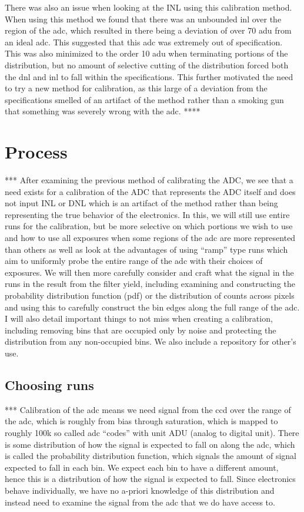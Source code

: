 \documentclass[11pt, letterpaper]{article}
\begin{document}
There was also an issue when looking at the INL using this calibration method. When using this method we found that there was an unbounded inl over the region of the adc, which resulted in there being a deviation of over 70 adu from an ideal adc. This suggested that this adc was extremely out of specification. This was also minimized to the order 10 adu when terminating portions of the distribution, but no amount of selective cutting of the distribution forced both the dnl and inl to fall within the specifications. This further motivated the need to try a new method for calibration, as this large of a deviation from the specifications smelled of an artifact of the method rather than a smoking gun that something was severely wrong with the adc. 
**** 

\section{Process}
*** After examining the previous method of calibrating the ADC, we see that a need exists for a calibration of the ADC that represents the ADC itself and does not input INL or DNL which is an artifact of the method rather than being representing the true behavior of the electronics. In this, we will still use entire runs for the calibration, but be more selective on which portions we wish to use and how to use all exposures when some regions of the adc are more represented than others as well as look at the advantages of using “ramp” type runs which aim to uniformly probe the entire range of the adc with their choices of exposures. We will then more carefully consider and craft what the signal in the runs in the result from the filter yield, including examining and constructing the probability distribution function (pdf) or the distribution of counts across pixels and using this to carefully construct the bin edges along the full range of the adc. I will also detail important things to not miss when creating a calibration, including removing bins that are occupied only by noise and protecting the distribution from any non-occupied bins. We also include a repository for other’s use. 

\subsection{Choosing runs}
***
Calibration of the adc means we need signal from the ccd over the range of the adc, which is roughly from bias through saturation, which is mapped to roughly 100k so called adc “codes” with unit ADU (analog to digital unit). There is some distribution of how the signal is expected to fall on along the adc, which is called the probability distribution function, which signals the amount of signal expected to fall in each bin. We expect each bin to have a different amount, hence this is a distribution of how the signal is expected to fall. Since electronics behave individually, we have no a-priori knowledge of this distribution and instead need to examine the signal from the adc that we do have access to. 
\end{document}
